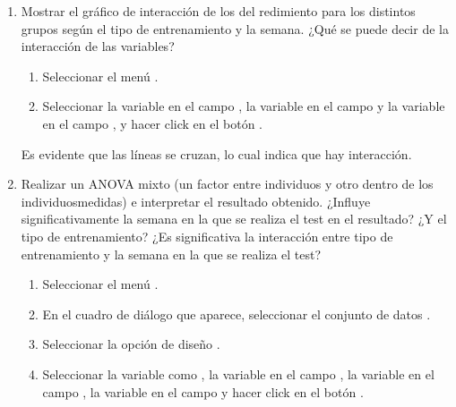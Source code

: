 \begin{enumerate}[leftmargin=*]
\begin{enumerate}
\item Mostrar el gráfico de interacción de los del redimiento para los distintos grupos según el tipo de entrenamiento y
la semana.
¿Qué se puede decir de la interacción de las variables?
\begin{indicacion}
\begin{enumerate}
\item Seleccionar el menú .
\item Seleccionar la variable  en el campo , la variable
 en el campo  y la variable  en el campo , y hacer click en el botón .
\end{enumerate}
Es evidente que las líneas se cruzan, lo cual indica que hay interacción.
\end{indicacion}

\item Realizar un ANOVA mixto (un factor entre individuos y otro dentro de los individuosmedidas) e interpretar el resultado obtenido.
¿Influye significativamente la semana en la que se realiza el test en el resultado? 
¿Y el tipo de entrenamiento?
¿Es significativa la interacción entre tipo de entrenamiento y la semana en la que se realiza el test?
\begin{indicacion}
\begin{enumerate}
\item Seleccionar el menú .
\item En el cuadro de diálogo que aparece, seleccionar el conjunto de datos .
\item Seleccionar la opción de diseño .
\item Seleccionar la variable  como , la variable
 en el campo , la variable  en el campo
, la variable  en el campo  y hacer click en el botón .
\end{enumerate}
\end{indicacion}


\end{enumerate}
\end{enumerate}
